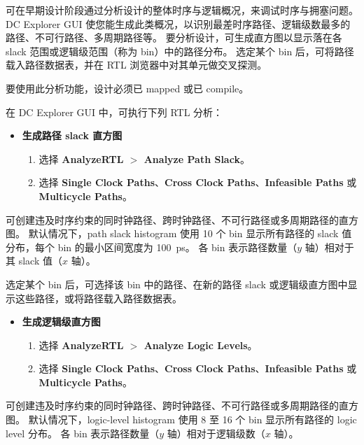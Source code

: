 可在早期设计阶段通过分析设计的整体时序与逻辑概况，来调试时序与拥塞问题。
DC Explorer GUI 使您能生成此类概况，以识别最差时序路径、逻辑级数最多的路径、不可行路径、多周期路径等。
要分析设计，可生成直方图以显示落在各 slack 范围或逻辑级范围（称为 bin）中的路径分布。
选定某个 bin 后，可将路径载入路径数据表，并在 RTL 浏览器中对其单元做交叉探测。

\begin{noteBox}
要使用此分析功能，设计必须已 mapped 或已 compile。
\end{noteBox}

在 DC Explorer GUI 中，可执行下列 RTL 分析：
\begin{itemize}
  \item \textbf{生成路径 slack 直方图}
  \begin{enumerate}
    \item 选择 \textbf{AnalyzeRTL $>$ Analyze Path Slack}。
    \item 选择 \textbf{Single Clock Paths}、\textbf{Cross Clock Paths}、\textbf{Infeasible Paths} 或 \textbf{Multicycle Paths}。
  \end{enumerate}
\end{itemize}


可创建违及时序约束的同时钟路径、跨时钟路径、不可行路径或多周期路径的直方图。
默认情况下，path slack histogram 使用 10 个 bin 显示所有路径的 slack 值分布，每个 bin 的最小区间宽度为 100~ps。
各 bin 表示路径数量（$y$ 轴）相对于其 slack 值（$x$ 轴）。

选定某个 bin 后，可选择该 bin 中的路径、在新的路径 slack 或逻辑级直方图中显示这些路径，或将路径载入路径数据表。

\begin{itemize}
  \item \textbf{生成逻辑级直方图}
  \begin{enumerate}
    \item 选择 \textbf{AnalyzeRTL $>$ Analyze Logic Levels}。
    \item 选择 \textbf{Single Clock Paths}、\textbf{Cross Clock Paths}、\textbf{Infeasible Paths} 或 \textbf{Multicycle Paths}。
  \end{enumerate}
\end{itemize}


可创建违及时序约束的同时钟路径、跨时钟路径、不可行路径或多周期路径的直方图。
默认情况下，logic-level histogram 使用 8 至 16 个 bin 显示所有路径的 logic level 分布。
各 bin 表示路径数量（$y$ 轴）相对于逻辑级数（$x$ 轴）。

